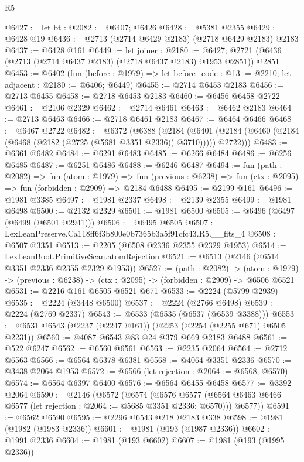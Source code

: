 \begin{lexlean}{R5}
\begin{coremodule}
@6427 := let bt : @2082 := @6407; @6426
@6428 := @5381 @2355
@6429 := @6428 @19
@6436 := @2713 (@2714 @6429 @2183) (@2718 @6429 @2183) @2183
@6437 := @6428 @161
@6449 := let joiner : @2180 := @6427;
  @2721 (@6436 (@2713 (@2714 @6437 @2183) (@2718 @6437 @2183) @1953 @2851)) @2851
@6453 := @6402
    (fun (before : @1979) => let before_code : @13 := @2210; let adjacent : @2180 := @6406; @6449)
@6455 := @2714 @6453 @2183
@6456 := @2713 @6455
@6458 := @2718 @6453 @2183
@6460 := @6456 @6458 @2722
@6461 := @2106 @2329
@6462 := @2714 @6461
@6463 := @6462 @2183
@6464 := @2713 @6463
@6466 := @2718 @6461 @2183
@6467 := @6464 @6466
@6468 := @6467 @2722
@6482 := @6372
    (@6388
      (@2184
        (@6401 (@2184 (@6460 (@2184 (@6468 (@2182 (@2725 (@5681 @3351 @2336)) @3710))))) @2722)))
@6483 := @6361 @6482
@6484 := @6291 @6483
@6485 := @6266 @6484
@6486 := @6256 @6485
@6487 := @6251 @6486
@6488 := @6246 @6487
@6494 := fun (path : @2082) =>
  fun (atom : @1979) =>
  fun (previous : @6238) => fun (ctx : @2095) => fun (forbidden : @2909) => @2184 @6488
@6495 := @2199 @161
@6496 := @1981 @3385
@6497 := @1981 @2337
@6498 := @2139 @2355
@6499 := @1981 @6498
@6500 := @2132 @2329
@6501 := @1981 @6500
@6505 := @6496 (@6497 (@6499 (@6501 @2941)))
@6506 := @6495 @6505
@6507 := LexLeanPreserve.Ca118ff6f3b800e0b7365b3a5f91cfc43.R5.__fits_4
@6508 := @6507 @3351
@6513 := @2205 (@6508 @2336 @2355 @2329 @1953)
@6514 := LexLeanBoot.PrimitiveScan.atomRejection
@6521 := @6513 (@2146 (@6514 @3351 @2336 @2355 @2329 @1953))
@6527 := (path : @2082) ->
  (atom : @1979) -> (previous : @6238) -> (ctx : @2095) -> (forbidden : @2909) -> @6506 @6521
@6531 := @2216 @161 @6505 @6521 @671
@6533 := @2224 (@5799 @2939)
@6535 := @2224 (@3448 @6500)
@6537 := @2224 (@2766 @6498)
@6539 := @2224 (@2769 @2337)
@6543 := @6533 (@6535 (@6537 (@6539 @3388)))
@6553 := @6531 @6543 (@2237 (@2247 @161)) (@2253 (@2254 (@2255 @671) @6505 @2231))
@6560 := @4087 @6543 @83 @24 @379 @669 @2183 @6488
@6561 := @522 @6247
@6562 := @6560 @6561
@6563 := @2235 @2064
@6564 := @2712 @6563
@6566 := @6564 @6378 @6381
@6568 := @4064 @3351 @2336
@6570 := @3438 @2064 @1953
@6572 := @6566 (let rejection : @2064 := @6568; @6570)
@6574 := @6564 @6397 @6400
@6576 := @6564 @6455 @6458
@6577 := @3392 @2064
@6590 := @2146
    (@6572
      (@6574
        (@6576 @6577 (@6564 @6463 @6466 @6577 (let rejection : @2064 := @5685 @3351 @2336; @6570)))
        @6577))
@6591 := @6562 @6590
@6595 := @2296 @6543 @218 @2183 @338
@6598 := @1981 (@1982 (@1983 @2336))
@6601 := @1981 (@193 (@1987 @2336))
@6602 := @1991 @2336
@6604 := @1981 (@193 @6602)
@6607 := @1981 (@193 (@1995 @2336))

\end{coremodule}
\end{lexlean}

